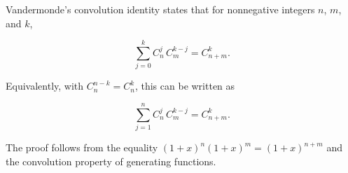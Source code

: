 Vandermonde's convolution identity states that for nonnegative integers $n$, $m$, and $k$,

$$\sum_{j=0}^{k} C_n^j \, C_m^{k-j} = C_{n+m}^k.$$

Equivalently, with $C_n^{n-k} = C_n^k$, this can be written as

$$\sum_{j=1}^{n} C_n^j \, C_{m}^{k-j} = C_{n+m}^k.$$

The proof follows from the equality $(1+x)^n (1+x)^m = (1+x)^{n+m}$ and the convolution property of generating functions.
